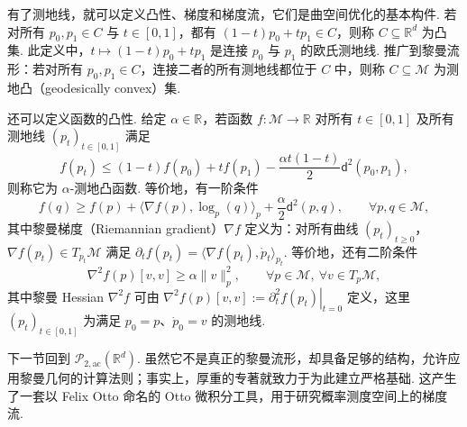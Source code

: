 有了测地线，就可以定义凸性、梯度和梯度流，它们是曲空间优化的基本构件. 若对所有 $p_0,p_1\in C$ 与 $t\in[0,1]$，都有 $(1-t)p_0+tp_1\in C$，则称 $C\subseteq\mathbb R^d$ 为凸集. 此定义中，$t\mapsto(1-t)p_0+tp_1$ 是连接 $p_0$ 与 $p_1$ 的欧氏测地线. 推广到黎曼流形：若对所有 $p_0,p_1\in C$，连接二者的所有测地线都位于 $C$ 中，则称 $C\subseteq\mathcal M$ 为测地凸（geodesically convex）集.

还可以定义函数的凸性. 给定 $\alpha\in\mathbb R$，若函数 $f:\mathcal M\to\mathbb R$ 对所有 $t\in[0,1]$ 及所有测地线 $(p_t)_{t\in[0,1]}$ 满足
\begin{equation}\label{eq:5.6}
f(p_t)\leq(1-t)f(p_0)+tf(p_1)-\frac{\alpha t(1-t)}2\mathsf d^2(p_0,p_1),
\end{equation}
则称它为 $\alpha$-测地凸函数. 等价地，有一阶条件
$$
f(q)\geq f(p)+\langle\nabla f(p),\log_p(q)\rangle_p+\frac\alpha2\mathsf d^2(p,q),
\qquad\forall p,q\in\mathcal M,
$$
其中黎曼梯度（Riemannian gradient）$\nabla f$ 定义为：对所有曲线 $(p_t)_{t\geq0}$，$\nabla f(p_t)\in T_{p_t}\mathcal M$ 满足 $\partial_tf(p_t)=\langle\nabla f(p_t),\dot p_t\rangle_{p_t}$. 等价地，还有二阶条件
$$
\nabla^2f(p)[v,v]\geq\alpha\|v\|_p^2,
\qquad\forall p\in\mathcal M,\ \forall v\in T_p\mathcal M,
$$
其中黎曼 Hessian $\nabla^2f$ 可由 $\nabla^2f(p)[v,v]:=\left.\partial_t^2f(p_t)\right|_{t=0}$ 定义，这里 $(p_t)_{t\in[0,1]}$ 为满足 $p_0=p$、$\dot p_0=v$ 的测地线.

下一节回到 $\mathcal P_{2,\mathrm{ac}}(\mathbb R^d)$. 虽然它不是真正的黎曼流形，却具备足够的结构，允许应用黎曼几何的计算法则；事实上，厚重的专著\cite{ref18}就致力于为此建立严格基础. 这产生了一套以 Felix Otto 命名的 Otto 微积分工具，用于研究概率测度空间上的梯度流.
